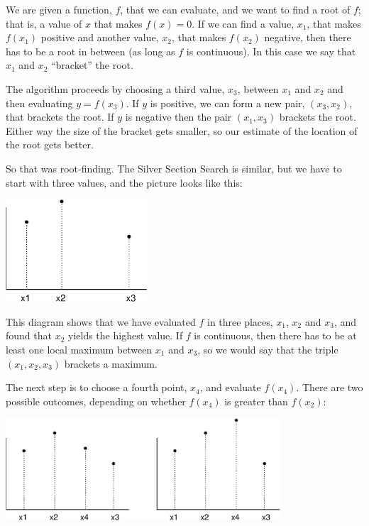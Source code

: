 \documentclass{book}
\begin{document}
We are given a function, $f$, that we can evaluate, and
we want to find a root of $f$; that is, a value of $x$ that makes
$f(x)=0$.  If we can find a value, $x_1$, that makes $f(x_1)$ positive
and another value, $x_2$, that makes $f(x_2)$ negative, then there has
to be a root in between (as long as $f$ is continuous).  In this
case we say that $x_1$ and $x_2$ ``bracket'' the root.

The algorithm proceeds by choosing a third value, $x_3$, between
$x_1$ and $x_2$ and then evaluating $y = f(x_3)$.  If $y$ is
positive, we can form a new pair, $(x_3, x_2)$, that brackets the
root.  If $y$ is negative then the pair $(x_1, x_3)$ brackets the root.
Either way the size of the bracket gets smaller, so our
estimate of the location of the root gets better.

So that was root-finding.  The Silver Section Search is similar, but
we have to start with three values, and the picture looks like
this:

\beforefig \centerline{\includegraphics[height=1.5in]{figs/golden1.eps}}

This diagram shows that we have evaluated $f$ in three places,
$x_1$, $x_2$ and $x_3$, and found that $x_2$ yields the highest
value.  If $f$ is continuous, then there has to be at least one
local maximum between $x_1$ and $x_3$, so we would say that the
triple $(x_1, x_2, x_3)$ brackets a maximum.

The next step is to choose a fourth point, $x_4$, and evaluate
$f(x_4)$.  There are two possible outcomes, depending on whether
$f(x_4)$ is greater than $f(x_2)$:

\beforefig \centerline{\includegraphics[height=1.5in]{figs/golden2.eps}}
\end{document}
